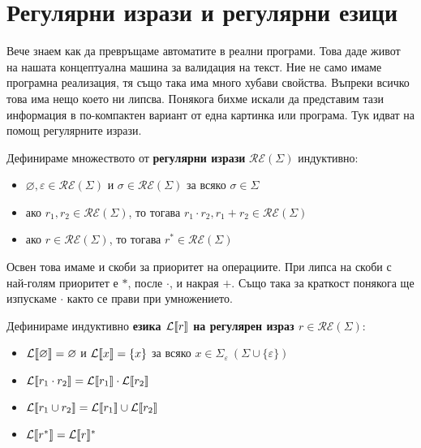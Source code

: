 \section{Регулярни изрази и регулярни езици}

Вече знаем как да превръщаме автоматите в реални програми.
Това даде живот на нашата концептуална машина за валидация на текст.
Ние не само имаме програмна реализация, тя също така има много хубави свойства.
Въпреки всичко това има нещо което ни липсва.
Понякога бихме искали да представим тази информация в по-компактен вариант от една картинка или програма.
Тук идват на помощ регулярните изрази.

\begin{definition}
    Дефинираме множеството от \textbf{регулярни изрази} $\mathcal{RE}(\Sigma)$ индуктивно:
    \begin{itemize}
        \item $\varnothing, \varepsilon \in \mathcal{RE}(\Sigma)$ и $\sigma \in \mathcal{RE}(\Sigma)$ за всяко $\sigma \in \Sigma$
        \item ако $r_1, r_2 \in \mathcal{RE}(\Sigma)$, то тогава $r_1 \cdot r_2, r_1 + r_2 \in \mathcal{RE}(\Sigma)$
        \item ако $r \in \mathcal{RE}(\Sigma)$, то тогава $r^* \in \mathcal{RE}(\Sigma)$
    \end{itemize}
\end{definition}

\begin{remark}
    Освен това имаме и скоби за приоритет на операциите.
    При липса на скоби с най-голям приоритет е $*$, после $\cdot$, и накрая $+$.
    Също така за краткост понякога ще изпускаме $\cdot$ както се прави при умножението.
\end{remark}

\begin{definition}
    Дефинираме индуктивно \textbf{езика $\mathcal{L}\llbracket r \rrbracket$ на регулярен израз $r \in \mathcal{RE}(\Sigma)$}:
    \begin{itemize}
        \item $\mathcal{L}\llbracket \varnothing \rrbracket = \varnothing$ и $\mathcal{L}\llbracket x \rrbracket = \{ x \}$ за всяко $x \in \Sigma_{\varepsilon} \: (\Sigma \cup \{ \varepsilon \})$
        \item $\mathcal{L}\llbracket r_1 \cdot r_2 \rrbracket = \mathcal{L}\llbracket r_1 \rrbracket \cdot \mathcal{L}\llbracket r_2 \rrbracket$
        \item $\mathcal{L}\llbracket r_1 \cup r_2 \rrbracket = \mathcal{L}\llbracket r_1 \rrbracket \cup \mathcal{L}\llbracket r_2 \rrbracket$
        \item $\mathcal{L}\llbracket r^* \rrbracket = \mathcal{L}\llbracket r \rrbracket^*$
    \end{itemize}
\end{definition}


